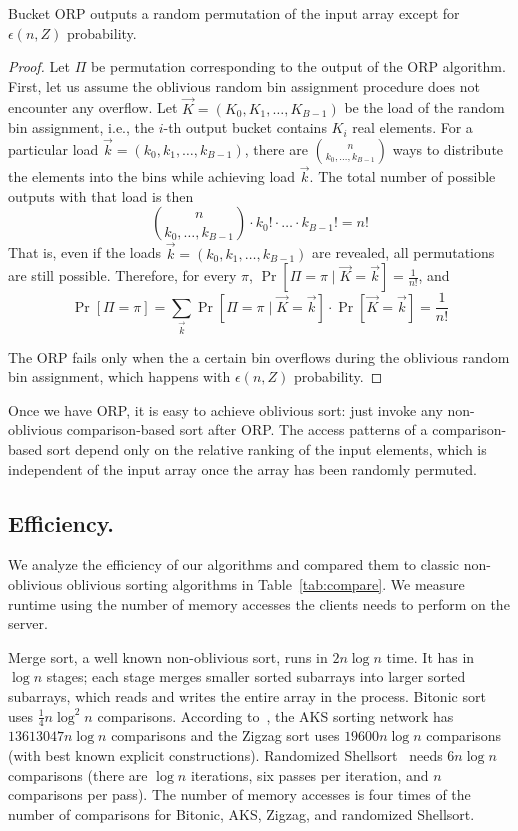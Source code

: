\begin{lemma}
Bucket ORP outputs a random permutation of the input array except for $\epsilon(n,Z)$ probability.
\end{lemma}
\begin{proof}
Let $\Pi$ be permutation corresponding to the output of the ORP algorithm.
First, let us assume the oblivious random bin assignment procedure does not encounter any overflow.
Let $\vec{K} = (K_0, K_1, \ldots, K_{B-1})$ be the load of the random bin assignment,
i.e., the $i$-th output bucket contains $K_i$ real elements. 
For a particular load $\vec{k}=(k_0, k_1, \ldots, k_{B-1})$, there are ${n \choose k_0,\ldots,k_{B-1}}$ ways to distribute the elements into the bins while achieving load $\vec{k}$.
The total number of possible outputs with that load is then
\[{n \choose k_0,\ldots,k_{B-1}} \cdot k_0! \cdot \ldots \cdot k_{B-1}! = n!\]
That is, even if the loads $\vec{k}=(k_0, k_1, \ldots, k_{B-1})$ are revealed, all permutations are still possible.
Therefore, for every $\pi$, $\Pr\left[\Pi = \pi \mid \vec{K}=\vec{k} \right] = \frac 1 {n!}$, and
\[ \Pr\left[\Pi = \pi\right] = \sum_{\vec{k}} \Pr\left[\Pi = \pi \mid \vec{K}=\vec{k} \right] \cdot \Pr\left[\vec{K}=\vec{k}\right] = \frac {1}{n!} \]

The ORP fails only when the a certain bin overflows during the oblivious random bin assignment, which happens with $\epsilon(n,Z)$ probability.
\end{proof}

Once we have ORP, it is easy to achieve oblivious sort: just invoke any non-oblivious comparison-based sort after ORP.
The access patterns of a comparison-based sort depend only on the relative ranking of the input elements, which is independent of the input array once the array has been randomly permuted.

\subsection{Efficiency.}
\label{sec:efficiency}

We analyze the efficiency of our algorithms and compared them to classic non-oblivious oblivious sorting algorithms in Table~\ref{tab:compare}.
We measure runtime using the number of memory accesses the clients needs to perform on the server.

Merge sort, a well known non-oblivious sort, runs in $2n\log n$ time. 
It has in $\log n$ stages; each stage merges smaller sorted subarrays into larger sorted subarrays,
which reads and writes the entire array in the process.
Bitonic sort uses $\frac 14 n\log^2 n$ comparisons.
According to~\cite{zigzag}, the AKS sorting network has $13613047 n\log n$ comparisons and the Zigzag sort uses $19600n\log n$ comparisons (with best known explicit constructions). 
Randomized Shellsort~\cite{RandShellsort} needs $6n\log n$ comparisons (there are $\log n$ iterations, six passes per iteration, and $n$ comparisons per pass). 
The number of memory accesses is four times of the number of comparisons for Bitonic, AKS, Zigzag, and randomized Shellsort.

